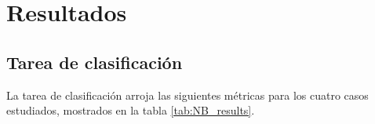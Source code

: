\documentclass[
	spanish, %
	letterpaper, oneside
]{article}
\begin{document}



\section{Resultados}

\subsection{Tarea de clasificación}

La tarea de clasificación arroja las siguientes métricas para los cuatro casos estudiados, mostrados en la tabla \ref{tab:NB_results}.
\end{document}
